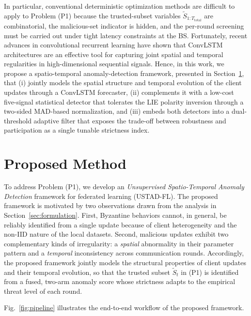 \documentclass[journal]{IEEEtran}
\begin{document}
In particular, conventional deterministic optimization methods are difficult to apply to Problem (P1) because the trusted-subset variables $\widetilde{S}_{1:T_{\text{total}}}$ are combinatorial, the malicious-set indicator is hidden, and the per-round screening must be carried out under tight latency constraints at the BS. Fortunately, recent advances in convolutional recurrent learning have shown that ConvLSTM~\cite{shi2015convolutional} architectures are an effective tool for capturing joint spatial and temporal regularities in high-dimensional sequential signals. Hence, in this work, we propose a spatio-temporal anomaly-detection framework, presented in Section~\ref{sec:method}, that (i) jointly models the spatial structure and temporal evolution of the client updates through a ConvLSTM forecaster, (ii) complements it with a low-cost five-signal statistical detector that tolerates the LIE polarity inversion through a two-sided MAD-based normalization, and (iii) embeds both detectors into a dual-threshold adaptive filter that exposes the trade-off between robustness and participation as a single tunable strictness index.

\section{Proposed Method}
\label{sec:method}

To address Problem (P1), we develop an \emph{Unsupervised Spatio-Temporal Anomaly Detection} framework for federated learning (USTAD-FL). The proposed framework is motivated by two observations drawn from the analysis in Section~\ref{sec:formulation}. First, Byzantine behaviors cannot, in general, be reliably identified from a single update because of client heterogeneity and the non-IID nature of the local datasets. Second, malicious updates exhibit two complementary kinds of irregularity: a \emph{spatial} abnormality in their parameter pattern and a \emph{temporal} inconsistency across communication rounds. Accordingly, the proposed framework jointly models the structural properties of client updates and their temporal evolution, so that the trusted subset $\widetilde{S}_t$ in (P1) is identified from a fused, two-arm anomaly score whose strictness adapts to the empirical threat level of each round.

Fig.~\ref{fig:pipeline} illustrates the end-to-end workflow of the proposed framework.
\end{document}
